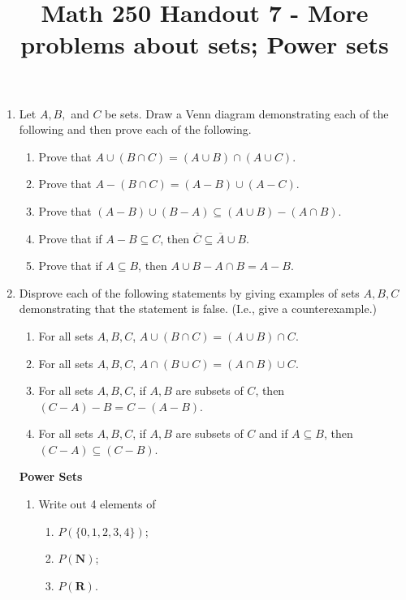 \documentclass[12pt, reqno]{amsart}
\begin{document}
\title[Math 250 Handout 7 - More problems about sets; Power sets]{Math 250 Handout 7 - More problems about sets; Power sets}\maketitle


\begin{enumerate}
\item Let $A,B,$ and $C$ be sets. Draw a Venn diagram demonstrating each of the following and then prove each of the following.



\begin{enumerate}
\item Prove that $A \cup (B \cap C) = (A\cup B) \cap (A \cup C)$.
\item Prove that $A - (B \cap C) = (A - B) \cup (A - C)$.
\item Prove that $(A - B) \cup (B-A) \subseteq (A \cup B) - (A \cap B)$.
\item Prove that if $A - B \subseteq C$, then $ \overline{C} \subseteq \overline{A} \cup B$.
\item Prove that if $A \subseteq B$, then $A\cup B - A \cap B = A - B$.
\end{enumerate}
\vspace{1cm}

\item Disprove each of the following statements by giving examples of sets
$A,B,C$ demonstrating that the statement is false. (I.e., give a counterexample.)
\begin{enumerate}
\item For all sets $A,B,C$, $A \cup (B \cap C) = (A\cup B) \cap C$.
\item For all sets $A,B,C$, $A \cap (B \cup C) = (A\cap B) \cup C$.
\item For all sets $A,B,C$, if $A,B$ are subsets of $C$, then $(C-A) - B = C-(A-B)$.
\item For all sets $A,B,C$, if $A,B$ are subsets of $C$ and if $A \subseteq B$, then $(C-A) \subseteq (C- B)$.
\end{enumerate}

\newpage
\textbf{Power Sets}\\

\begin{enumerate}
\item Write out 4 elements of
 \begin{enumerate}
 \item $P(\{0,1,2,3,4\})$;
 \item $P(\mathbf{N})$;
 \item $P(\mathbf{R})$.\\
 \end{enumerate}
 \vspace{5cm}


\end{enumerate}
\end{enumerate}
\end{document}
